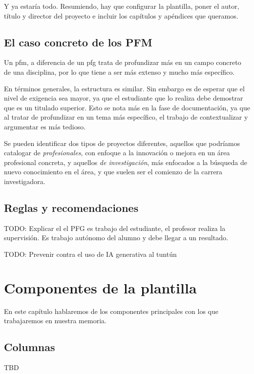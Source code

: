 \documentclass[%
    school=etsisi,%
    degree=61TI,%
]{upm-report}
\begin{document}
Y ya estaría todo. Resumiendo, hay que configurar la plantilla, poner
el autor, título y director del proyecto e incluir los capítulos y
apéndices que queramos.

\section{El caso concreto de los PFM}

Un \gls{pfm}, a diferencia de un \gls{pfg} trata de profundizar más en
un campo concreto de una disciplina, por lo que tiene a ser más extenso
y mucho más específico.

En términos generales, la estructura es similar. Sin embargo es de
esperar que el nivel de exigencia sea mayor, ya que el estudiante que
lo realiza debe demostrar que es un titulado superior. Esto se nota más
en la fase de documentación, ya que al tratar de profundizar en un tema
más específico, el trabajo de contextualizar y argumentar es más
tedioso.

Se pueden identificar dos tipos de proyectos diferentes, aquellos que
podríamos catalogar de \textit{profesionales}, con enfoque a la
innovación o mejora en un área profesional concreta, y aquellos
\textit{de investigación}, más enfocados a la búsqueda de nuevo
conocimiento en el área, y que suelen ser el comienzo de la carrera
investigadora.

\section{Reglas y recomendaciones}

TODO: Explicar el el PFG es trabajo del estudiante, el profesor realiza la supervisión. Es trabajo autónomo del alumno y debe llegar a un resultado.

TODO: Prevenir contra el uso de IA generativa al tuntún


\chapter{Componentes de la plantilla}
\label{ch:componentes-de-la-plantilla}

En este capítulo hablaremos de los componentes principales con los que trabajaremos en nuestra memoria.

\section{Columnas}

TBD
\end{document}
